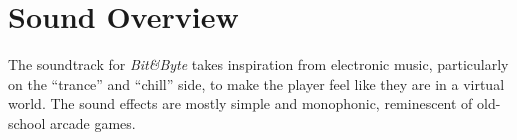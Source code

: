 \documentclass[12pt, a4paper]{report}
\begin{document}
\chapter{Sound Overview}
The soundtrack for \textit{Bit&Byte} takes inspiration from electronic music, particularly on the “trance” and “chill” side, to make the player feel like they are in a virtual world.
The sound effects are mostly simple and monophonic, reminescent of old-school arcade games.\\
\end{document}
